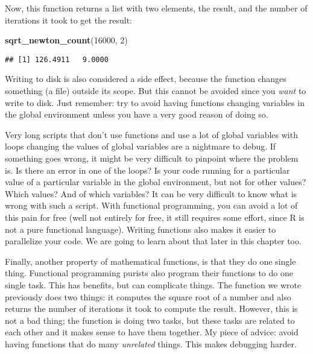 \documentclass[
]{article}
\newenvironment{Shaded}{\begin{snugshade}}{\end{snugshade}}
\newcommand{\DecValTok}[1]{\textcolor[rgb]{0.00,0.00,0.81}{#1}}
\newcommand{\KeywordTok}[1]{\textcolor[rgb]{0.13,0.29,0.53}{\textbf{#1}}}
\newcommand{\NormalTok}[1]{#1}
\begin{document}
Now, this function returns a list with two elements, the result, and the number of iterations it
took to get the result:

\begin{Shaded}
\begin{Highlighting}[]
\KeywordTok{sqrt\_newton\_count}\NormalTok{(}\DecValTok{16000}\NormalTok{, }\DecValTok{2}\NormalTok{)}
\end{Highlighting}
\end{Shaded}

\begin{verbatim}
## [1] 126.4911   9.0000
\end{verbatim}

Writing to disk is also considered a side effect, because the function changes something (a file)
outside its scope. But this cannot be avoided since you \emph{want} to write to disk.
Just remember: try to avoid having functions changing variables in the global environment unless
you have a very good reason of doing so.

Very long scripts that don't use functions and use a lot of global variables with loops changing
the values of global variables are a nightmare to debug. If something goes wrong, it might be very
difficult to pinpoint where the problem is. Is there an error in one of the loops?
Is your code running for a particular value of a particular variable in the global environment, but
not for other values? Which values? And of which variables? It can be very difficult to know what
is wrong with such a script.
With functional programming, you can avoid a lot of this pain for free (well not entirely for free,
it still requires some effort, since R is not a pure functional language). Writing functions also
makes it easier to parallelize your code. We are going to learn about that later in this chapter too.

Finally, another property of mathematical functions, is that they do one single thing. Functional
programming purists also program their functions to do one single task. This has benefits, but
can complicate things. The function we wrote previously does two things: it computes the square
root of a number and also returns the number of iterations it took to compute the result. However,
this is not a bad thing; the function is doing two tasks, but these tasks are related to each other
and it makes sense to have them together. My piece of advice: avoid having functions that do
many \emph{unrelated} things. This makes debugging harder.
\end{document}

